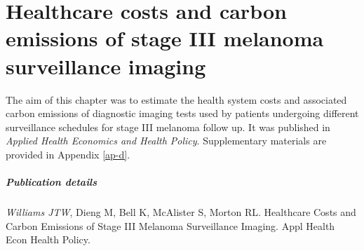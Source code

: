 \chapter{Healthcare costs and carbon emissions of stage III melanoma surveillance imaging}
\label{ch-5}

The aim of this chapter was to estimate the health system costs and associated carbon emissions of diagnostic imaging tests used by patients undergoing different surveillance schedules for stage III melanoma follow up. It was published in \textit{Applied Health Economics and Health Policy}. Supplementary materials are provided in Appendix \ref{ap-d}.

\paragraph*{Publication details}
\textit{Williams JTW}, Dieng M, Bell K, McAlister S, Morton RL. Healthcare Costs and Carbon Emissions of Stage III Melanoma Surveillance Imaging. Appl Health Econ Health Policy.






















